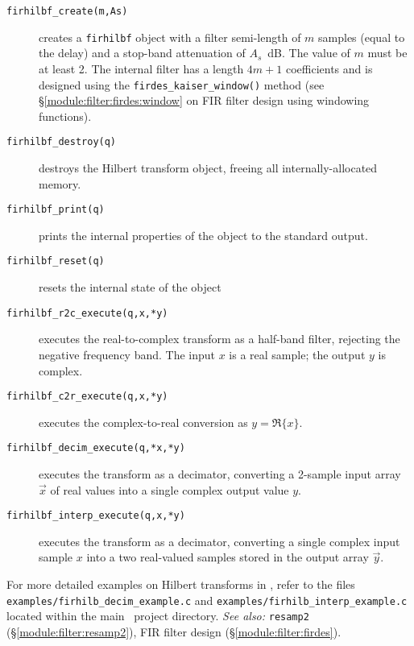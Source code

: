 \begin{description}
\item[{\tt firhilbf\_create(m,As)}]
    creates a {\tt firhilbf} object with a filter semi-length of $m$
    samples (equal to the delay)
    and a stop-band attenuation of $A_s$~dB.
    The value of $m$ must be at least 2.
    The internal filter has a length $4m+1$ coefficients and is designed
    using the {\tt firdes\_kaiser\_window()} method
    (see \S\ref{module:filter:firdes:window} on FIR filter design
    using windowing functions).
\item[{\tt firhilbf\_destroy(q)}]
    destroys the Hilbert transform object, freeing all
    internally-allocated memory.
\item[{\tt firhilbf\_print(q)}]
    prints the internal properties of the object to the standard
    output.
\item[{\tt firhilbf\_reset(q)}]
    resets the internal state of the object
\item[{\tt firhilbf\_r2c\_execute(q,x,*y)}]
    executes the real-to-complex transform as a half-band filter,
    rejecting the negative frequency band.
    The input $x$ is a real sample;
    the output $y$ is complex.
\item[{\tt firhilbf\_c2r\_execute(q,x,*y)}]
    executes the complex-to-real conversion as $y = \Re\{x\}$.
\item[{\tt firhilbf\_decim\_execute(q,*x,*y)}]
    executes the transform as a decimator, converting a 2-sample input
    array $\vec{x}$ of real values into a single complex output value
    $y$.
\item[{\tt firhilbf\_interp\_execute(q,x,*y)}]
    executes the transform as a decimator, converting a single complex
    input sample $x$ into a two real-valued samples stored in the output
    array $\vec{y}$.
\end{description}
%
For more detailed examples on Hilbert transforms in \liquid,
refer to the files
{\tt examples/firhilb\_decim\_example.c} and
{\tt examples/firhilb\_interp\_example.c}
located within the main \liquid\ project directory.
%
{\it See also:} {\tt resamp2} (\S\ref{module:filter:resamp2}),
FIR filter design (\S\ref{module:filter:firdes}).



% 
%
